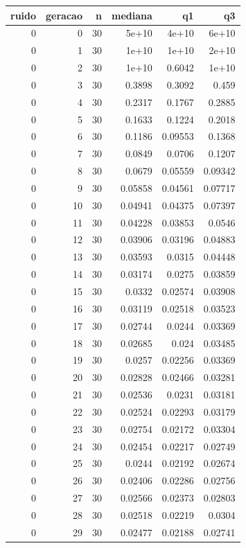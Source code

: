 \begin{tabular}{rrrrrr}
\toprule
ruido & geracao & n & mediana & q1 & q3 \\
\midrule
0 & 0 & 30 & 5e+10 & 4e+10 & 6e+10 \\
0 & 1 & 30 & 1e+10 & 1e+10 & 2e+10 \\
0 & 2 & 30 & 1e+10 & 0.6042 & 1e+10 \\
0 & 3 & 30 & 0.3898 & 0.3092 & 0.459 \\
0 & 4 & 30 & 0.2317 & 0.1767 & 0.2885 \\
0 & 5 & 30 & 0.1633 & 0.1224 & 0.2018 \\
0 & 6 & 30 & 0.1186 & 0.09553 & 0.1368 \\
0 & 7 & 30 & 0.0849 & 0.0706 & 0.1207 \\
0 & 8 & 30 & 0.0679 & 0.05559 & 0.09342 \\
0 & 9 & 30 & 0.05858 & 0.04561 & 0.07717 \\
0 & 10 & 30 & 0.04941 & 0.04375 & 0.07397 \\
0 & 11 & 30 & 0.04228 & 0.03853 & 0.0546 \\
0 & 12 & 30 & 0.03906 & 0.03196 & 0.04883 \\
0 & 13 & 30 & 0.03593 & 0.0315 & 0.04448 \\
0 & 14 & 30 & 0.03174 & 0.0275 & 0.03859 \\
0 & 15 & 30 & 0.0332 & 0.02574 & 0.03908 \\
0 & 16 & 30 & 0.03119 & 0.02518 & 0.03523 \\
0 & 17 & 30 & 0.02744 & 0.0244 & 0.03369 \\
0 & 18 & 30 & 0.02685 & 0.024 & 0.03485 \\
0 & 19 & 30 & 0.0257 & 0.02256 & 0.03369 \\
0 & 20 & 30 & 0.02828 & 0.02466 & 0.03281 \\
0 & 21 & 30 & 0.02536 & 0.0231 & 0.03181 \\
0 & 22 & 30 & 0.02524 & 0.02293 & 0.03179 \\
0 & 23 & 30 & 0.02754 & 0.02172 & 0.03304 \\
0 & 24 & 30 & 0.02454 & 0.02217 & 0.02749 \\
0 & 25 & 30 & 0.0244 & 0.02192 & 0.02674 \\
0 & 26 & 30 & 0.02406 & 0.02286 & 0.02756 \\
0 & 27 & 30 & 0.02566 & 0.02373 & 0.02803 \\
0 & 28 & 30 & 0.02518 & 0.02219 & 0.0304 \\
0 & 29 & 30 & 0.02477 & 0.02188 & 0.02741 \\

\end{tabular}

